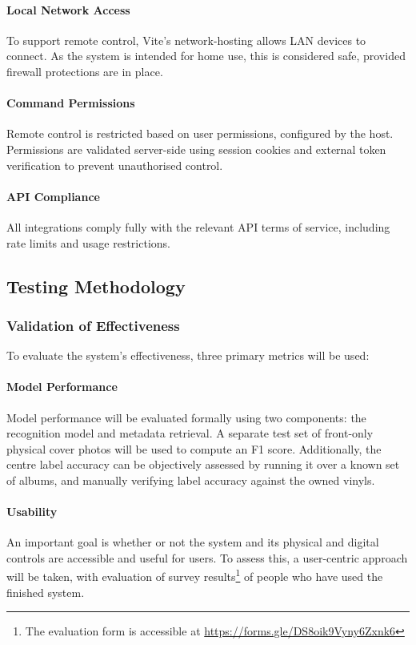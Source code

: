             \paragraph{Local Network Access} To support remote control, Vite's network-hosting allows LAN devices to connect. As the system is intended for home use, this is considered safe, provided firewall protections are in place.
    
            \paragraph{Command Permissions} Remote control is restricted based on user permissions, configured by the host. Permissions are validated server-side using session cookies and external token verification to prevent unauthorised control.
    
            \paragraph{API Compliance} All integrations comply fully with the relevant API terms of service, including rate limits and usage restrictions.
        
            \subsection{Testing Methodology}
                
                \subsubsection{Validation of Effectiveness}
        
                    To evaluate the system’s effectiveness, three primary metrics will be used:
        
                    \paragraph{Model Performance} Model performance will be evaluated formally using two components: the recognition model and metadata retrieval. A separate test set of front-only physical cover photos will be used to compute an F1 score. Additionally, the centre label accuracy can be objectively assessed by running it over a known set of albums, and manually verifying label accuracy against the owned vinyls.
        
                    \paragraph{Usability} An important goal is whether or not the system and its physical and digital controls are accessible and useful for users. To assess this, a user-centric approach will be taken, with evaluation of survey results\footnote{The evaluation form is accessible at \href{https://forms.gle/DS8oik9Vyny6Zxnk6}{https://forms.gle/DS8oik9Vyny6Zxnk6}} of people who have used the finished system.
        
